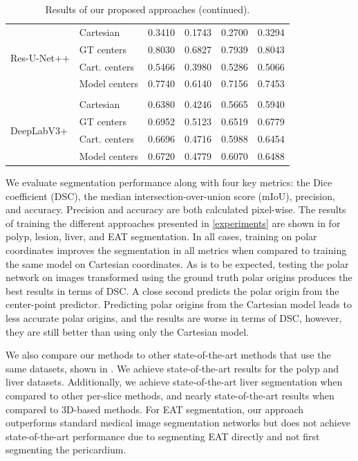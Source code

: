 \begin{table}[t!]
\begin{tabularx}{\textwidth}{X X c c c c}
 \multirow{4}{7em}{{Res-U-Net++}}
& Cartesian & 0.3410 & 0.1743 & 0.2700 & 0.3294 \\
& GT centers & 0.8030 & 0.6827 & 0.7939 & 0.8043 \\
& Cart. centers & 0.5466 & 0.3980 & 0.5286 & 0.5066 \\
& Model centers & 0.7740 & 0.6140 & 0.7156 & 0.7453 \\ [1ex]
\hline \\ [-1.5ex]

 \multirow{4}{7em}{{DeepLabV3+}}
& Cartesian & 0.6380 & 0.4246 & 0.5665 & 0.5940 \\
& GT centers & 0.6952 & 0.5123 & 0.6519 & 0.6779 \\
& Cart. centers & 0.6696 & 0.4716 & 0.5988 & 0.6454 \\
& Model centers & 0.6720 & 0.4779 & 0.6070 & 0.6488 \\ [1ex]
\end{tabularx}
\caption{Results of our proposed approaches (continued).}
\label{table:results}
\end{table}

We evaluate segmentation performance along with four key metrics: the Dice coefficient (DSC), the median intersection-over-union score (mIoU), precision, and accuracy. Precision and accuracy are both calculated pixel-wise. The results of training the different approaches presented in \ref{experiments} are shown in  for polyp, lesion, liver, and EAT segmentation. In all cases, training on polar coordinates improves the segmentation in all metrics when compared to training the same model on Cartesian coordinates. As is to be expected, testing the polar network on images transformed using the ground truth polar origins produces the best results in terms of DSC. A close second predicts the polar origin from the center-point predictor. Predicting polar origins from the Cartesian model leads to less accurate polar origins, and the results are worse in terms of DSC, however, they are still better than using only the Cartesian model.

We also compare our methods to other state-of-the-art methods that use the same datasets, shown in . We achieve state-of-the-art results for the polyp and liver datasets. Additionally, we achieve state-of-the-art liver segmentation when compared to other per-slice methods, and nearly state-of-the-art results when compared to 3D-based methods. For EAT segmentation, our approach outperforms standard medical image segmentation networks but does not achieve state-of-the-art performance due to segmenting EAT directly and not first segmenting the pericardium.

